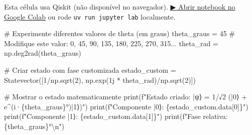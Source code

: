 \documentclass[
  brazilian,
]{report}
\newenvironment{Shaded}{\begin{snugshade}}{\end{snugshade}}
\newcommand{\BuiltInTok}[1]{\textcolor[rgb]{0.00,0.23,0.31}{#1}}
\newcommand{\CharTok}[1]{\textcolor[rgb]{0.13,0.47,0.30}{#1}}
\newcommand{\CommentTok}[1]{\textcolor[rgb]{0.37,0.37,0.37}{#1}}
\newcommand{\DecValTok}[1]{\textcolor[rgb]{0.68,0.00,0.00}{#1}}
\newcommand{\NormalTok}[1]{\textcolor[rgb]{0.00,0.23,0.31}{#1}}
\newcommand{\OperatorTok}[1]{\textcolor[rgb]{0.37,0.37,0.37}{#1}}
\newcommand{\OtherTok}[1]{\textcolor[rgb]{0.00,0.23,0.31}{#1}}
\newcommand{\SpecialCharTok}[1]{\textcolor[rgb]{0.37,0.37,0.37}{#1}}
\newcommand{\SpecialStringTok}[1]{\textcolor[rgb]{0.13,0.47,0.30}{#1}}
\begin{document}
\begin{tcolorbox}[enhanced jigsaw, arc=.35mm, bottomrule=.15mm, bottomtitle=1mm, breakable, colback=white, colbacktitle=quarto-callout-warning-color!10!white, colframe=quarto-callout-warning-color-frame, coltitle=black, left=2mm, leftrule=.75mm, opacityback=0, opacitybacktitle=0.6, rightrule=.15mm, title=\textcolor{quarto-callout-warning-color}{\faExclamationTriangle}\hspace{0.5em}{⚛️ Célula Qiskit --- execute no Colab ou localmente}, titlerule=0mm, toprule=.15mm, toptitle=1mm]

Esta célula usa Qiskit (não disponível no navegador).
\href{https://colab.research.google.com/github/maxwellamaral/aula-quantum/blob/main/notebooks/00b-phases.ipynb}{▶
Abrir notebook no Google Colab} ou rode \texttt{uv\ run\ jupyter\ lab}
localmente.

\begin{Shaded}
\begin{Highlighting}[]

\CommentTok{\# Experimente diferentes valores de theta (em graus)}
\NormalTok{theta\_graus }\OperatorTok{=} \DecValTok{45}  \CommentTok{\# Modifique este valor: 0, 45, 90, 135, 180, 225, 270, 315...}
\NormalTok{theta\_rad }\OperatorTok{=}\NormalTok{ np.deg2rad(theta\_graus)}

\CommentTok{\# Criar estado com fase customizada}
\NormalTok{estado\_custom }\OperatorTok{=}\NormalTok{ Statevector([}\DecValTok{1}\OperatorTok{/}\NormalTok{np.sqrt(}\DecValTok{2}\NormalTok{), np.exp(}\OtherTok{1j} \OperatorTok{*}\NormalTok{ theta\_rad)}\OperatorTok{/}\NormalTok{np.sqrt(}\DecValTok{2}\NormalTok{)])}

\CommentTok{\# Mostrar o estado matematicamente}
\BuiltInTok{print}\NormalTok{(}\SpecialStringTok{f"Estado criado: |ψ⟩ = 1/√2 (|0⟩ + e\^{}(i·}\SpecialCharTok{\{}\NormalTok{theta\_graus}\SpecialCharTok{\}}\SpecialStringTok{°)|1⟩)"}\NormalTok{)}
\BuiltInTok{print}\NormalTok{(}\SpecialStringTok{f"Componente |0⟩: }\SpecialCharTok{\{}\NormalTok{estado\_custom}\SpecialCharTok{.}\NormalTok{data[}\DecValTok{0}\NormalTok{]}\SpecialCharTok{\}}\SpecialStringTok{"}\NormalTok{)}
\BuiltInTok{print}\NormalTok{(}\SpecialStringTok{f"Componente |1⟩: }\SpecialCharTok{\{}\NormalTok{estado\_custom}\SpecialCharTok{.}\NormalTok{data[}\DecValTok{1}\NormalTok{]}\SpecialCharTok{\}}\SpecialStringTok{"}\NormalTok{)}
\BuiltInTok{print}\NormalTok{(}\SpecialStringTok{f"Fase relativa: }\SpecialCharTok{\{}\NormalTok{theta\_graus}\SpecialCharTok{\}}\SpecialStringTok{°}\CharTok{\textbackslash{}n}\SpecialStringTok{"}\NormalTok{)}


\end{Highlighting}
\end{Shaded}
\end{tcolorbox}
\end{document}
